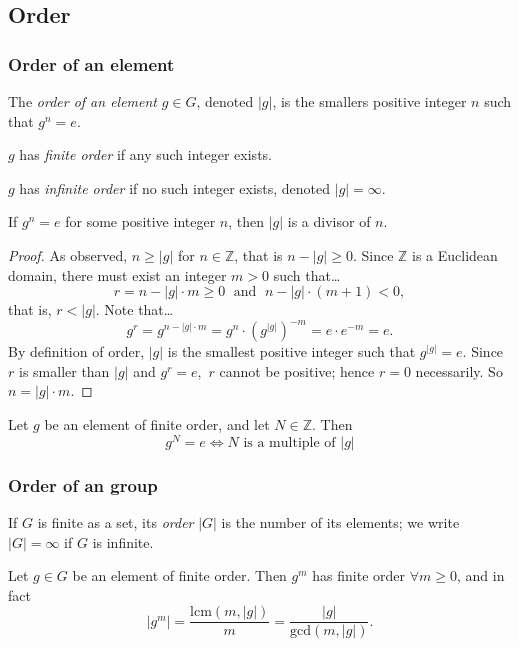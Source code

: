 \subsection{Order}

\subsubsection{Order of an element}\label{elementorder}
The \emph{order of an element} $g \in G$, denoted $|g|$, is the smallers positive integer $n$ such that $g^n = e$.

\noindent $g$ has \emph{finite order} if any such integer exists.\newline

\noindent $g$ has \emph{infinite order} if no such integer exists, denoted $|g| = \infty$.\newline

\begin{lemma}
If $g^n = e$ for some positive integer $n$, then $|g|$ is a divisor of $n$.
\end{lemma}

\begin{proof}
As observed, $n \geq |g|$ for $n \in \mathbb{Z}$, that is $n - |g| \geq 0$. Since $\mathbb{Z}$ is a Euclidean domain, there must exist
an integer $m > 0$ such that\dots
$$r = n -|g|\cdot m \geq 0 \; \textrm{ and } \; n - |g| \cdot (m + 1) < 0,$$
that is, $r < |g|$. Note that\dots
$$g^r = g^{n - |g| \cdot m} = g^n \cdot (g^{|g|})^{-m} = e \cdot e^{-m} = e.$$
By definition of order, $|g|$ is the smallest positive integer such that $g^{|g|}=e.$ Since $r$ is smaller than $|g|$ and $g^r = e,$ $r$ cannot
be positive; hence $r = 0$ necessarily. So $n = |g| \cdot m$.
\end{proof}

\begin{corollary}
Let $g$ be an element of finite order, and let $N \in \mathbb{Z}$. Then
$$g^N = e \Leftrightarrow N \textrm{ is a multiple of } |g|$$
\end{corollary}

\subsubsection{Order of an group}\label{grouporder}
If $G$ is finite as a set, its \emph{order} $|G|$ is the number of its elements; we write $|G| = \infty$ if $G$ is infinite.

\begin{proposition}
Let $g \in G$ be an element of finite order. Then $g^m$ has finite order $\forall m \geq 0$, and in fact
$$|g^m| = \frac{\textrm{lcm}(m,|g|)}{m} = \frac{|g|}{\textrm{gcd}(m,|g|)}.$$
\end{proposition}


